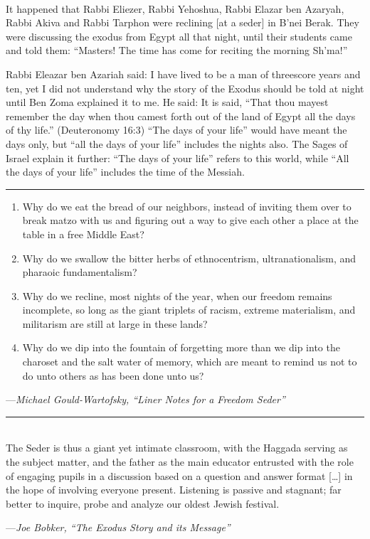 \documentclass[a4paper,10pt,openany]{memoir}
\newcommand{\HgSource}[1]{\hfill{\small---\itshape{#1}}}
\newcommand{\HgFill}{\vfill \hrule \vfill}
\newenvironment{HgEnglish}{\strut\\\noindent}{\vspace{1em}}
\newcommand{\LSrc}{\textsuperscript{\upshape{[L]}}}
\begin{document}
\begin{HgEnglish}
It happened that Rabbi Eliezer, Rabbi Yehoshua, Rabbi Elazar ben Azaryah, Rabbi
Akiva and Rabbi Tarphon were reclining [at a seder] in B'nei Berak. They were
discussing the exodus from Egypt all that night, until their students came and
told them: ``Masters! The time has come for reciting the morning Sh'ma!''

Rabbi Eleazar ben Azariah said: I have lived to be a man of threescore years and
ten, yet I did not understand why the story of the Exodus should be told at
night until Ben Zoma explained it to me. He said: It is said, ``That thou mayest
remember the day when thou camest forth out of the land of Egypt all the days of
thy life.'' (Deuteronomy 16:3) ``The days of your life'' would have meant the
days only, but ``all the days of your life'' includes the nights also.  The
Sages of Israel explain it further: ``The days of your life'' refers to this
world, while ``All the days of your life'' includes the time of the Messiah.
\LSrc
\end{HgEnglish}

\HgFill

\begin{enumerate}
  \item
    Why do we eat the bread of our neighbors, instead of inviting them over to
    break matzo with us and figuring out a way to give each other a place at the
    table in a free Middle East?

  \item
    Why do we swallow the bitter herbs of ethnocentrism, ultranationalism, and
    pharaoic fundamentalism? 

  \item
    Why do we recline, most nights of the year, when our freedom remains
    incomplete, so long as the giant triplets of racism, extreme materialism,
    and militarism are still at large in these lands?

  \item
    Why do we dip into the fountain of forgetting more than we dip into the
    \linebreak
    charoset and the salt water of memory, which are meant to remind us not to
    do unto others as has been done unto us?
\end{enumerate}
\HgSource{Michael Gould-Wartofsky, ``Liner Notes for a Freedom Seder''}\\

\HgFill

\begin{HgEnglish}
  The Seder is thus a giant yet intimate classroom, with the Haggada serving as
  the subject matter, and the father as the main educator entrusted with the
  role of engaging pupils in a discussion based on a question and answer format
  [\ldots] in the hope of involving everyone present. Listening is passive and
  stagnant; far better to inquire, probe and analyze our oldest Jewish festival.

  \HgSource{Joe Bobker, ``The Exodus Story and its Message''}
\end{HgEnglish}
\end{document}

